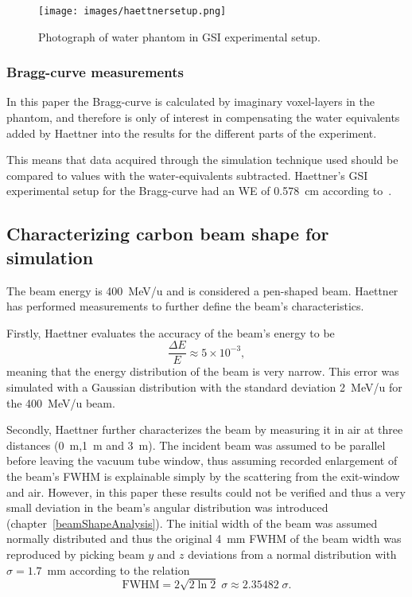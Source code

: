 \begin{figure}[!h] 
\begin{center}
\texttt{[image: images/haettnersetup.png]}  
\caption{\label{fig:ehaettnerSetupPhotograph}Photograph of water phantom in GSI experimental setup.}
\end{center}
\end{figure}

\subsubsection{Bragg-curve measurements}
In this paper the Bragg-curve is calculated by imaginary voxel-layers in the phantom, and therefore is only of interest in compensating the water equivalents added by Haettner into the results for the different parts of the experiment.

This means that data acquired through the simulation technique used should be compared to values with the water-equivalents subtracted. Haettner's GSI experimental setup for the Bragg-curve had an WE of 0.578~cm according to~\cite[table 4.1]{ehaettner}.




\subsection{Characterizing carbon beam shape for simulation}


The beam energy is 400~MeV/u and is considered a pen-shaped beam. Haettner has performed measurements to further define the beam's characteristics.

Firstly, Haettner evaluates the accuracy of the beam's energy to be \begin{equation}\frac{\Delta E}{E}\approx5\times10^{-3},\end{equation}meaning that the energy distribution of the beam is very narrow. This error was simulated with a Gaussian distribution with the standard deviation 2~MeV/u for the 400~MeV/u beam.

Secondly, Haettner further characterizes the beam by measuring it in air at three distances (0~m,1~m and 3~m). The incident beam was assumed to be parallel before leaving the vacuum tube window, thus assuming recorded enlargement of the beam's FWHM is explainable simply by the scattering from the exit-window and air. However, in this paper these results could not be verified and thus a very small deviation in the beam's angular distribution was introduced (chapter~\ref{beamShapeAnalysis}). The initial width of the beam was assumed normally distributed and thus the original 4~mm FWHM of the beam width was reproduced by picking beam $y$ and $z$ deviations from a normal distribution with $\sigma = 1.7$~mm according to the relation \begin{equation}\mathrm{FWHM} =   2 \sqrt{2 \ln 2 } \; \sigma \approx 2.35482 \; \sigma.\end{equation}

